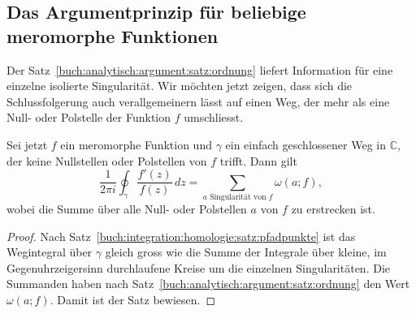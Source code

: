 %
%
%
\subsection{Das Argumentprinzip für beliebige meromorphe Funktionen}
Der Satz~\ref{buch:analytisch:argument:satz:ordnung}
liefert Information für eine einzelne isolierte Singularität.
Wir möchten jetzt zeigen, dass sich die Schlussfolgerung auch
verallgemeinern lässt auf einen Weg, der mehr als eine Null-
oder Polstelle der Funktion $f$ umschliesst.

\begin{satz}
\label{buch:analytisch:argument:satz:argument}
%
Sei jetzt $f$ ein meromorphe Funktion und $\gamma$ ein einfach
geschlossener Weg in $\mathbb{C}$, der keine Nullstellen oder Polstellen
von $f$ trifft.
Dann gilt
\[
\frac{1}{2\pi i}
\oint_\gamma
\frac{f'(z)}{f(z)}
\,dz
=
\sum_{\text{$a$ Singularität von $f$}}
\omega(a;f),
\]
wobei die Summe über alle Null- oder Polstellen $a$ von $f$ 
zu erstrecken ist.
\end{satz}

\begin{proof}
Nach Satz~\ref{buch:integration:homologie:satz:pfadpunkte} ist das
Wegintegral über $\gamma$ gleich gross wie die Summe der Integrale
über kleine, im Gegenuhrzeigersinn durchlaufene Kreise um die einzelnen
Singularitäten.
Die Summanden haben nach
Satz~\ref{buch:analytisch:argument:satz:ordnung}
den Wert $\omega(a;f)$.
Damit ist der Satz bewiesen.
\end{proof}
